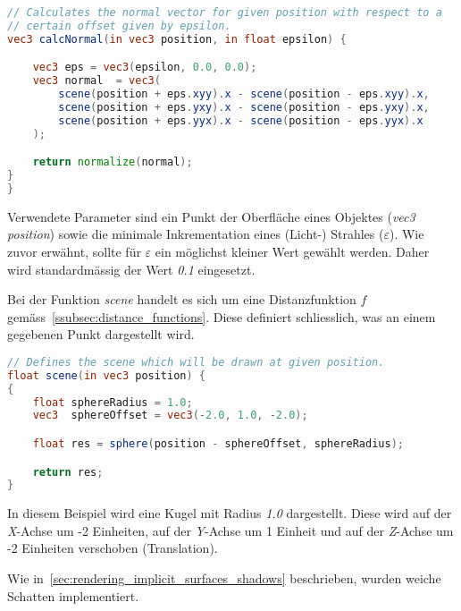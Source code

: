 \begin{minipage}{\linewidth}
\begin{lstlisting}[language=GLSL,caption={Berechnung der Normalen einer
        impliziten Oberfläche in
        GLSL.},label={alg:glsl_normal},captionpos=b,emph={calcNormal}]
// Calculates the normal vector for given position with respect to a
// certain offset given by epsilon.
vec3 calcNormal(in vec3 position, in float epsilon) {

    vec3 eps = vec3(epsilon, 0.0, 0.0);
    vec3 normal  = vec3(
        scene(position + eps.xyy).x - scene(position - eps.xyy).x,
        scene(position + eps.yxy).x - scene(position - eps.yxy).x,
        scene(position + eps.yyx).x - scene(position - eps.yyx).x
    );

    return normalize(normal);
}
}
\end{lstlisting}
\end{minipage}

Verwendete Parameter sind ein Punkt der Oberfläche eines Objektes
(\textit{vec3 position}) sowie die minimale Inkrementation eines
(Licht-) Strahles ($\varepsilon$). Wie zuvor erwähnt, sollte
für $\varepsilon$ ein möglichst kleiner Wert gewählt werden. Daher wird
standardmässig der Wert \textit{0.1} eingesetzt.

Bei der Funktion \textit{scene} handelt es sich um eine Distanzfunktion
$f$ gemäss~\autoref{ssubsec:distance_functions}. Diese definiert
schliesslich, was an einem gegebenen Punkt dargestellt wird.

\begin{minipage}{\linewidth}
\begin{lstlisting}[language=GLSL,caption={Distanzfunktion $f$ in
        GLSL.},label={alg:glsl_distance_func},captionpos=b,emph={scene}]
// Defines the scene which will be drawn at given position.
float scene(in vec3 position) {
{
    float sphereRadius = 1.0;
    vec3  sphereOffset = vec3(-2.0, 1.0, -2.0);

    float res = sphere(position - sphereOffset, sphereRadius);

    return res;
}
\end{lstlisting}
\end{minipage}

In diesem Beispiel wird eine Kugel mit Radius \textit{1.0} dargestellt.
Diese wird auf der \textit{X}-Achse um -2 Einheiten, auf der
\textit{Y}-Achse um 1 Einheit und auf der \textit{Z}-Achse um -2
Einheiten verschoben (Translation).

Wie in~\autoref{sec:rendering_implicit_surfaces_shadows} beschrieben,
wurden weiche Schatten implementiert.


